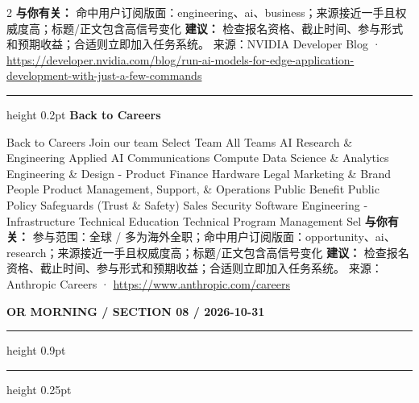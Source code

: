 \documentclass[10.5pt]{ctexart}
\begin{document}
\begin{multicols}{2}
\textbf{与你有关：} 命中用户订阅版面：engineering、ai、business；来源接近一手且权威度高；标题/正文包含高信号变化
\textbf{建议：} 检查报名资格、截止时间、参与形式和预期收益；合适则立即加入任务系统。
{\footnotesize\color{ormuted} 来源：NVIDIA Developer Blog · \url{https://developer.nvidia.com/blog/run-ai-models-for-edge-application-development-with-just-a-few-commands}}
\vspace{2mm}
\hrule height 0.2pt
\vspace{2mm}
{\large\bfseries Back to Careers}\par
Back to Careers Join our team Select Team All Teams AI Research \& Engineering Applied AI Communications Compute Data Science \& Analytics Engineering \& Design - Product Finance Hardware Legal Marketing \& Brand People Product Management, Support, \& Operations Public Benefit Public Policy Safeguards (Trust \& Safety) Sales Security Software Engineering - Infrastructure Technical Education Technical Program Management Sel
\textbf{与你有关：} 参与范围：全球 / 多为海外全职；命中用户订阅版面：opportunity、ai、research；来源接近一手且权威度高；标题/正文包含高信号变化
\textbf{建议：} 检查报名资格、截止时间、参与形式和预期收益；合适则立即加入任务系统。
{\footnotesize\color{ormuted} 来源：Anthropic Careers · \url{https://www.anthropic.com/careers}}
\end{multicols}
\newpage
{\small\bfseries OR MORNING / SECTION 08 / 2026-10-31}
\vspace{2mm}
\hrule height 0.9pt
\vspace{1.5mm}
\hrule height 0.25pt
\vspace{4mm}
\end{document}
